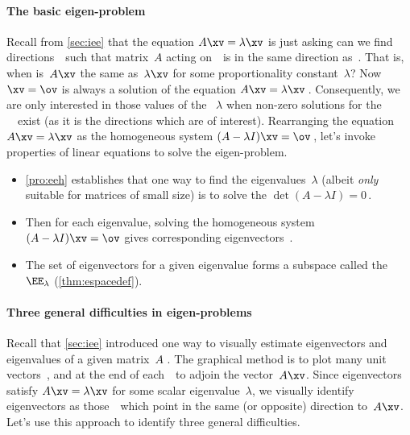 \paragraph{The basic eigen-problem}
Recall from \autoref{sec:iee} that the  equation \(A\xv=\lambda\xv\) is just asking can we find directions~\xv\ such that matrix~\(A\) acting on~\xv\ is in the same direction as~\xv. 
That is, when is~\(A\xv\) the same as~\(\lambda\xv\) for some proportionality constant~\(\lambda\)?
Now \(\xv=\ov\) is always a solution of the  equation \(A\xv=\lambda \xv\)\,.
Consequently, we are only interested in those values of the ~\(\lambda\) when non-zero solutions for the ~\xv\ exist (as it is the directions which are of interest).
Rearranging the equation \(A\xv=\lambda\xv\) as the homogeneous system \((A-\lambda I)\xv=\ov\)\,, let's invoke properties of linear equations to solve the eigen-problem.
\begin{itemize}
\item \autoref{pro:eeh} establishes that one way to find the eigenvalues~\(\lambda\) (albeit \emph{only} suitable for matrices of small size) is to solve the  \(\det(A-\lambda I)=0\)\,. 
\item Then for each eigenvalue, solving the homogeneous system \((A-\lambda I)\xv=\ov\) gives corresponding eigenvectors~\xv. 
\item The set of eigenvectors for a given eigenvalue forms a subspace called the ~\(\EE_\lambda\) (\autoref{thm:espacedef}).

\end{itemize}






\paragraph{Three general difficulties in eigen-problems}
Recall that \autoref{sec:iee} introduced one way to visually estimate eigenvectors and eigenvalues of a given matrix~\(A\) \cite[]{Schonefeld1995}. 
The graphical method is to plot many unit vectors~\xv, and at the end of each~\xv\ to adjoin the vector~\(A\xv\).
Since eigenvectors satisfy \(A\xv=\lambda\xv\) for some scalar eigenvalue~\(\lambda\), we visually identify eigenvectors as those~\xv\ which point in the same (or opposite) direction to~\(A\xv\).
Let's use this approach to identify three general difficulties.

